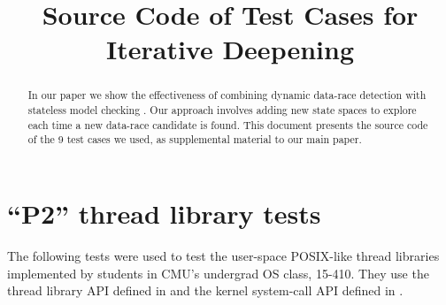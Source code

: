 \documentclass[pldi]{../sigplanconf-pldi15}
\begin{document}
%
%

\newcommand\quicksand{\textsc{Quicksand}}
\newcommand\simics{\textsc{Simics}}
\newcommand{\sect}[1]{\S #1}
\newcommand\hilight[2]{\color{#1}#2\color{black}}

\title{Source Code of Test Cases for Iterative Deepening}

\maketitle
\begin{abstract}
In our paper we show the effectiveness of combining dynamic data-race detection \cite{eraser,hybriddatarace} with stateless model checking \cite{verisoft,dpor,chess}.
Our approach involves adding new state spaces to explore each time a new data-race candidate is found.
This document presents the source code of the 9 test cases we used, as supplemental material to our main paper.
\end{abstract}

\section{``P2'' thread library tests}

The following tests were used to test the user-space POSIX-like thread libraries implemented by students in CMU's undergrad OS class, 15-410.
They use the thread library API defined in \cite{thrlib} and the kernel system-call API defined in \cite{kspec}.
\end{document}
